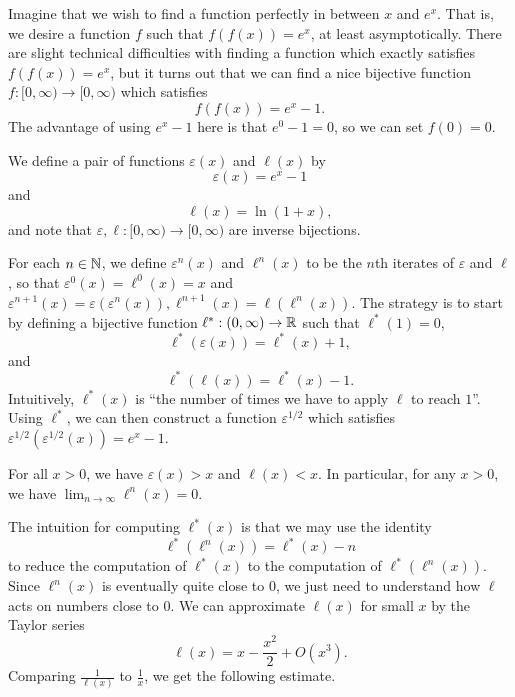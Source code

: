 \documentclass[letterpaper,11pt]{article}
\begin{document}
Imagine that we wish to find a function perfectly in between $x$ and $e^x$. That is, we desire a function $f$ such that $f(f(x)) = e^x$, at least asymptotically. There are slight technical difficulties with finding a function which exactly satisfies $f(f(x)) = e^x$, but it turns out that we can find a nice bijective function $f : [0,\infty) \rightarrow [0,\infty)$ which satisfies
\[
f(f(x)) = e^x - 1.
\]
The advantage of using $e^x - 1$ here is that $e^0 - 1 = 0$, so we can set $f(0) = 0$.

We define a pair of functions $\varepsilon(x)$ and $\ell(x)$ by
\[
\varepsilon(x) = e^x - 1
\]
and
\[
\ell(x) = \ln(1 + x),
\]
and note that $\varepsilon, \ell : [0,\infty) \rightarrow [0,\infty)$ are inverse bijections.

For each $n \in \mathbb{N}$, we define $\varepsilon^n(x)$ and $\ell^n(x)$ to be the $n$th iterates of $\varepsilon$ and $\ell$, so that $\varepsilon^0(x) = \ell^0(x) = x$ and $\varepsilon^{n+1}(x) = \varepsilon(\varepsilon^n(x)), \ell^{n+1}(x) = \ell(\ell^n(x))$. The strategy is to start by defining a bijective function $\ell^* : (0,\infty) \rightarrow \mathbb{R}$ such that $\ell^*(1) = 0$,
\[
\ell^*(\varepsilon(x)) = \ell^*(x) + 1,
\]
and
\[
\ell^*(\ell(x)) = \ell^*(x) - 1.
\]
Intuitively, $\ell^*(x)$ is ``the number of times we have to apply $\ell$ to reach $1$''. Using $\ell^*$, we can then construct a function $\varepsilon^{1/2}$ which satisfies $\varepsilon^{1/2}(\varepsilon^{1/2}(x)) = e^x - 1$.

\begin{prop} For all $x > 0$, we have $\varepsilon(x) > x$ and $\ell(x) < x$. In particular, for any $x > 0$, we have $\lim_{n \rightarrow \infty} \ell^n(x) = 0$.
\end{prop}

The intuition for computing $\ell^*(x)$ is that we may use the identity
\[
\ell^*(\ell^n(x)) = \ell^*(x) - n
\]
to reduce the computation of $\ell^*(x)$ to the computation of $\ell^*(\ell^n(x))$. Since $\ell^n(x)$ is eventually quite close to $0$, we just need to understand how $\ell$ acts on numbers close to $0$. We can approximate $\ell(x)$ for small $x$ by the Taylor series
\[
\ell(x) = x - \frac{x^2}{2} + O(x^3).
\]
Comparing $\frac{1}{\ell(x)}$ to $\frac{1}{x}$, we get the following estimate.
\end{document}

